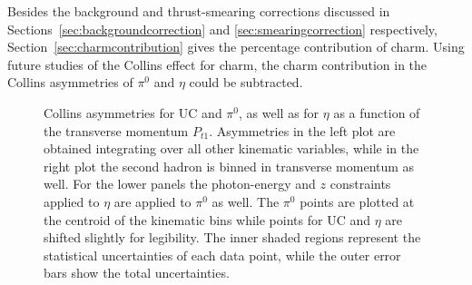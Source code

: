 Besides the background and thrust-smearing corrections discussed in Sections~\ref{sec:backgroundcorrection} and \ref{sec:smearingcorrection} respectively, Section~\ref{sec:charmcontribution} gives the percentage contribution of charm. Using future studies of the Collins effect for charm, the charm contribution in the Collins asymmetries of $\pi^0$ and $\eta$ could be subtracted. 


\begin{figure}[H]
  \centering
\caption[Collins asymmetries for UC and $\pi^0$, as well as for $\eta$ as a function of $P_{t1}$]{Collins asymmetries for UC and $\pi^0$, as well as for $\eta$ as a function of the transverse momentum $P_{t1}$. 
Asymmetries in the left plot are obtained integrating over all other kinematic variables, while in the right plot the second hadron is binned in transverse momentum as well.
For the lower panels the photon-energy and $z$ constraints applied to $\eta$ are applied to $\pi^0$ as well. 
The $\pi^0$ points are plotted at the centroid of the kinematic bins while points for UC and $\eta$ are shifted slightly for legibility. 
The inner shaded regions represent the statistical uncertainties of each data point, while the outer error bars show the total uncertainties.}
\label{fig:finalasymmetry1}
\end{figure}

